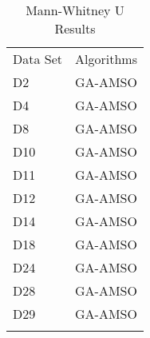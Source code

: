 \begin{table}
\caption{Mann-Whitney U Results}
\label{tbl:mann:whitney:u}
\begin{tabular}{ll}
\noalign{\smallskip}\hline\noalign{\smallskip}
Data Set & Algorithms \\
\noalign{\smallskip}\hline
D2&GA-AMSO\\
D4&GA-AMSO\\
D8&GA-AMSO\\
D10&GA-AMSO\\
D11&GA-AMSO\\
D12&GA-AMSO\\
D14&GA-AMSO\\
D18&GA-AMSO\\
D24&GA-AMSO\\
D28&GA-AMSO\\
D29&GA-AMSO\\
\noalign{\smallskip}\hline
\end{tabular}
\end{table}

